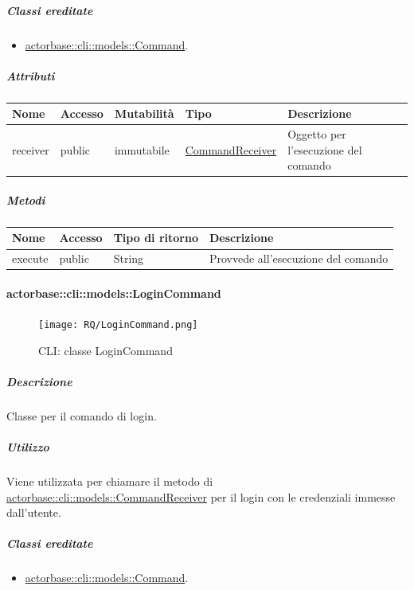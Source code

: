 \documentclass{scalatekids-article}
\begin{document}
\subparagraph{Classi ereditate}

\begin{itemize}
\item \hyperref[sec:actorbase::cli::models::Command]{actorbase::cli::models::Command}.
\end{itemize}

\subparagraph{Attributi}

\begin{tabular}{| p{1cm} | p{1.5cm} | p{2cm} | p{4cm} | p{8.5cm} |}
  \hline
  Nome & Accesso & Mutabilità & Tipo & Descrizione\\
  \hline
  receiver & public & immutabile & \hyperref[sec:actorbase::cli::models::CommandReceiver]{CommandReceiver} & Oggetto per l'esecuzione del comando\\
  \hline
\end{tabular}

\subparagraph{Metodi}

\begin{tabular}{| l | l | l | l |}
  \hline
  Nome & Accesso & Tipo di ritorno & Descrizione\\
  \hline
  execute & public & String & Provvede all'esecuzione del comando\\
  \hline
\end{tabular}

\paragraph{actorbase::cli::models::LoginCommand}
\label{sec:actorbase::cli::models::LoginCommand}

\begin{figure}[H]
  \begin{center}
    \texttt{[image: RQ/LoginCommand.png]}
    \caption{CLI: classe LoginCommand}
  \end{center}
\end{figure}

\subparagraph{Descrizione}

Classe per il comando di login.

\subparagraph{Utilizzo}

Viene utilizzata per chiamare il metodo di
\hyperref[sec:actorbase::cli::models::CommandReceiver]{actorbase::cli::models::CommandReceiver} per il login con le credenziali
immesse dall'utente.

\subparagraph{Classi ereditate}

\begin{itemize}
\item \hyperref[sec:actorbase::cli::models::Command]{actorbase::cli::models::Command}.
\end{itemize}
\end{document}
